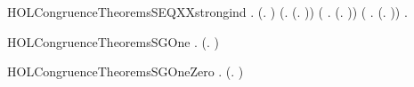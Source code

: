 \newcommand{\HOLCongruenceTheoremsSEQXXrules}{\UseVerbatim{HOLCongruenceTheoremsSEQXXrules}}
\begin{SaveVerbatim}{HOLCongruenceTheoremsSEQXXstrongind}
\HOLTokenTurnstile{} \HOLSymConst{\HOLTokenForall{}}.
        (\HOLTokenLambda{}. ) \HOLSymConst{\HOLTokenConj{}} (\HOLSymConst{\HOLTokenForall{}}.  (\HOLTokenLambda{}. )) \HOLSymConst{\HOLTokenConj{}}
       (\HOLSymConst{\HOLTokenForall{}} .   \HOLSymConst{\HOLTokenConj{}}   \HOLSymConst{\HOLTokenImp{}}  (\HOLTokenLambda{}.  )) \HOLSymConst{\HOLTokenConj{}}
       (\HOLSymConst{\HOLTokenForall{}} .
              \HOLSymConst{\HOLTokenConj{}}   \HOLSymConst{\HOLTokenConj{}}   \HOLSymConst{\HOLTokenConj{}}   \HOLSymConst{\HOLTokenImp{}}
             (\HOLTokenLambda{}.   \HOLSymConst{+}  )) \HOLSymConst{\HOLTokenImp{}}
       \HOLSymConst{\HOLTokenForall{}}.   \HOLSymConst{\HOLTokenImp{}}  
\end{SaveVerbatim}
\newcommand{\HOLCongruenceTheoremsSEQXXstrongind}{\UseVerbatim{HOLCongruenceTheoremsSEQXXstrongind}}
\begin{SaveVerbatim}{HOLCongruenceTheoremsSGOne}
\HOLTokenTurnstile{} \HOLSymConst{\HOLTokenForall{}}.  (\HOLTokenLambda{}. )
\end{SaveVerbatim}
\newcommand{\HOLCongruenceTheoremsSGOne}{\UseVerbatim{HOLCongruenceTheoremsSGOne}}
\begin{SaveVerbatim}{HOLCongruenceTheoremsSGOneZero}
\HOLTokenTurnstile{} \HOLSymConst{\HOLTokenForall{}} .  (\HOLTokenLambda{}. \HOLConst{\ensuremath{\tau}}  \HOLSymConst{+} \HOLConst{\ensuremath{\tau}} ) \HOLSymConst{\HOLTokenImp{}}   \HOLSymConst{\HOLTokenConj{}}  
\end{SaveVerbatim}
